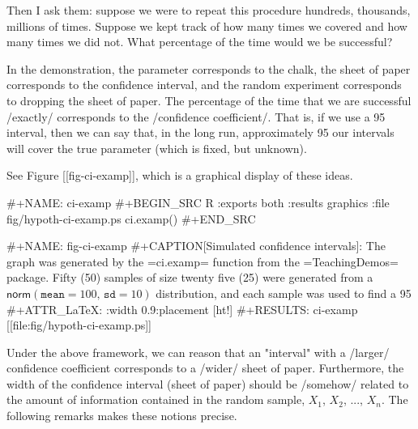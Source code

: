 Then I ask them: suppose we were to repeat this procedure hundreds,
thousands, millions of times. Suppose we kept track of how many times
we covered and how many times we did not. What percentage of the time
would we be successful?

In the demonstration, the parameter corresponds to the chalk, the
sheet of paper corresponds to the confidence interval, and the random
experiment corresponds to dropping the sheet of paper. The percentage
of the time that we are successful /exactly/ corresponds to the
/confidence coefficient/. That is, if we use a 95%
interval, then we can say that, in the long run, approximately 95%
our intervals will cover the true parameter (which is fixed, but
unknown).

See Figure [[fig-ci-examp]], which is a graphical display of these ideas.

#+NAME: ci-examp
#+BEGIN_SRC R :exports both :results graphics :file fig/hypoth-ci-examp.ps
ci.examp()
#+END_SRC

#+NAME: fig-ci-examp
#+CAPTION[Simulated confidence intervals]: \small The graph was generated by the =ci.examp= function from the =TeachingDemos= package. Fifty (50) samples of size twenty five (25) were generated from a \( \mathsf{norm}(\mathtt{mean}=100,\,\mathtt{sd}=10) \) distribution, and each sample was used to find a 95%
#+ATTR_LaTeX: :width 0.9\textwidth :placement [ht!]
#+RESULTS: ci-examp
[[file:fig/hypoth-ci-examp.ps]]

Under the above framework, we can reason that an "interval" with a
/larger/ confidence coefficient corresponds to a /wider/ sheet of
paper. Furthermore, the width of the confidence interval (sheet of
paper) should be /somehow/ related to the amount of information
contained in the random sample, \(X_{1}\), \(X_{2}\), ...,
\(X_{n}\). The following remarks makes these notions precise.


